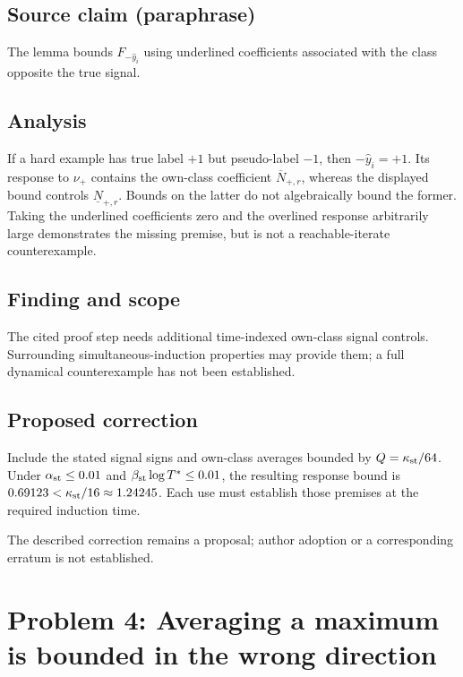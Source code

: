\documentclass[11pt]{article}
\begin{document}
\subsection*{Source claim (paraphrase)}

The lemma bounds \(F_{-\hat y_i}\) using underlined coefficients associated with the class opposite the true signal.

\subsection*{Analysis}

If a hard example has true label \(+1\) but pseudo-label \(-1\), then \(-\hat y_i=+1\). Its response to \(\nu_+\) contains the own-class coefficient \(\overline N_{+,r}\), whereas the displayed bound controls \(\underline N_{+,r}\). Bounds on the latter do not algebraically bound the former. Taking the underlined coefficients zero and the overlined response arbitrarily large demonstrates the missing premise, but is not a reachable-iterate counterexample.

\subsection*{Finding and scope}

The cited proof step needs additional time-indexed own-class signal controls. Surrounding simultaneous-induction properties may provide them; a full dynamical counterexample has not been established.

\subsection*{Proposed correction}

Include the stated signal signs and own-class averages bounded by \(Q=\kappa_{\rm st}/64\). Under \(\alpha_{\rm st}\leq0.01\) and \(\beta_{\rm st}\log T^*\leq0.01\), the resulting response bound is \(0.69123<\kappa_{\rm st}/16\approx1.24245\). Each use must establish those premises at the required induction time.

The described correction remains a proposal; author adoption or a corresponding erratum is not established.

\section*{Problem 4: Averaging a maximum is bounded in the wrong direction}
\end{document}
